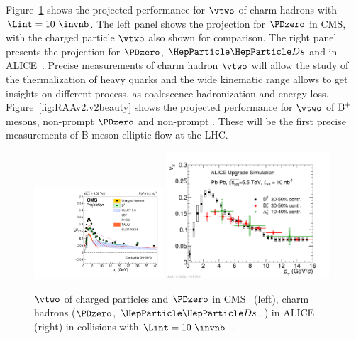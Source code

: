 Figure~\ref{fig:RAAv2.v2charm} shows the projected performance for $\vtwo$ of charm hadrons with $\Lint=10~\invnb$. The left panel shows the projection for $\PDzero$ in CMS, with the charged particle $\vtwo$ also shown for comparison. The right panel presents the projection for $\PDzero$, $\PDs$ and \PGLc in ALICE~\cite{Abelev:1625842}. Precise measurements of charm hadron $\vtwo$ will allow the study of the thermalization of heavy quarks and the wide kinematic range allows to get insights on different process, as coalescence hadronization and energy loss. Figure~\ref{fig:RAAv2.v2beauty} shows the projected performance for $\vtwo$ of $\rm B^+$ mesons, non-prompt $\PDzero$ and non-prompt \PJGy. These will be the first precise measurements of B meson elliptic flow at the LHC.

\begin{figure}[ht]
  \begin{center}
    \includegraphics[width=0.43\textwidth]{hf/figures/cV2_lumiMB_0_wTheory_right.pdf}
   \includegraphics[width=0.54\textwidth]{hf/figures/ALICEUpgrade_charmv2.pdf}
    \caption{$\vtwo$ of charged particles and $\PDzero$ in CMS~\cite{CMS-PAS-FTR-17-002} (left), charm hadrons ($\PDzero$, $\PDs$, \PGLc) in ALICE (right) in \PbPb collisions with $\Lint=10~\invnb$~\cite{Abelev:1625842}.}
    \label{fig:RAAv2.v2charm}
  \end{center}
\end{figure}
